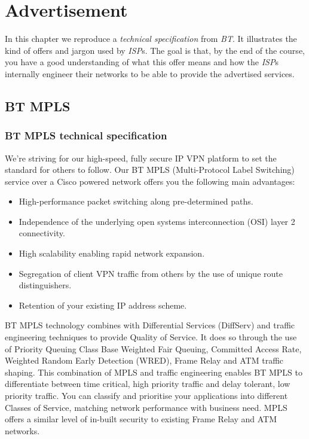 \chapter{Advertisement}

In this chapter we reproduce a \emph{technical specification} from \emph{BT}. 
It illustrates the kind of offers and jargon used by \emph{ISP}s.
The goal is that, by the end of the course, you have a good understanding of what this offer means and how the \emph{ISP}s internally engineer their networks to be able to provide the advertised services.

\section{BT MPLS}
        
        
\subsection{BT MPLS technical specification}

We're striving for our high-speed, fully secure IP VPN platform to set the standard for others to follow. Our BT MPLS (Multi-Protocol Label Switching) service over a Cisco powered network offers you the following main advantages:

\begin{itemize}
\item High-performance packet switching along pre-determined paths.
\item Independence of the underlying open systems interconnection (OSI) layer 2 connectivity.
\item High scalability enabling rapid network expansion.
\item Segregation of client VPN traffic from others by the use of unique route distinguishers.
\item Retention of your existing IP address scheme.
\end{itemize}

BT MPLS technology combines with Differential Services (DiffServ) and traffic engineering techniques to provide Quality of Service. It does so through the use of Priority Queuing Class Base Weighted Fair Queuing, Committed Access Rate, Weighted Random Early Detection (WRED), Frame Relay and ATM traffic shaping. This combination of MPLS and traffic engineering enables BT MPLS to differentiate between time critical, high priority traffic and delay tolerant, low priority traffic. You can classify and prioritise your applications into different Classes of Service, matching network performance with business need. MPLS offers a similar level of in-built security to existing Frame Relay and ATM networks.

